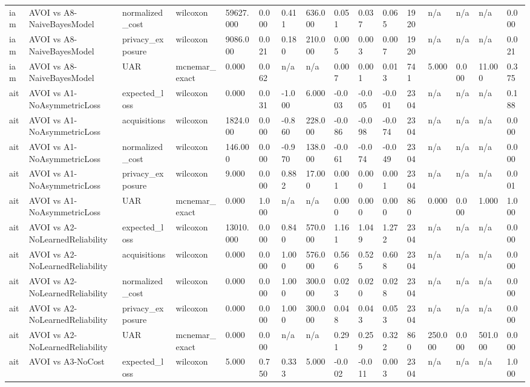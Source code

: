 \begin{table}[!ht]
{\begin{tabular}{llllllllllllllll}
iam & AVOI vs A8-NaiveBayesModel & normalized\_cost & wilcoxon & 59627.000 & 0.000 & 0.411 & 636.000 & 0.051 & 0.037 & 0.065 & 1920 & n/a & n/a & n/a & 0.000 \\
iam & AVOI vs A8-NaiveBayesModel & privacy\_exposure & wilcoxon & 9086.000 & 0.021 & 0.180 & 210.000 & 0.005 & 0.003 & 0.007 & 1920 & n/a & n/a & n/a & 0.021 \\
iam & AVOI vs A8-NaiveBayesModel & UAR & mcnemar\_exact & 0.000 & 0.062 & n/a & n/a & 0.007 & 0.001 & 0.013 & 741 & 5.000 & 0.000 & 11.000 & 0.375 \\
ait & AVOI vs A1-NoAsymmetricLoss & expected\_loss & wilcoxon & 0.000 & 0.031 & -1.000 & 6.000 & -0.003 & -0.005 & -0.001 & 2304 & n/a & n/a & n/a & 0.188 \\
ait & AVOI vs A1-NoAsymmetricLoss & acquisitions & wilcoxon & 1824.000 & 0.000 & -0.860 & 228.000 & -0.086 & -0.098 & -0.074 & 2304 & n/a & n/a & n/a & 0.000 \\
ait & AVOI vs A1-NoAsymmetricLoss & normalized\_cost & wilcoxon & 146.000 & 0.000 & -0.970 & 138.000 & -0.061 & -0.074 & -0.049 & 2304 & n/a & n/a & n/a & 0.000 \\
ait & AVOI vs A1-NoAsymmetricLoss & privacy\_exposure & wilcoxon & 9.000 & 0.000 & 0.882 & 17.000 & 0.001 & 0.000 & 0.001 & 2304 & n/a & n/a & n/a & 0.001 \\
ait & AVOI vs A1-NoAsymmetricLoss & UAR & mcnemar\_exact & 0.000 & 1.000 & n/a & n/a & 0.000 & 0.000 & 0.000 & 860 & 0.000 & 0.000 & 1.000 & 1.000 \\
ait & AVOI vs A2-NoLearnedReliability & expected\_loss & wilcoxon & 13010.000 & 0.000 & 0.840 & 570.000 & 1.161 & 1.049 & 1.272 & 2304 & n/a & n/a & n/a & 0.000 \\
ait & AVOI vs A2-NoLearnedReliability & acquisitions & wilcoxon & 0.000 & 0.000 & 1.000 & 576.000 & 0.566 & 0.525 & 0.608 & 2304 & n/a & n/a & n/a & 0.000 \\
ait & AVOI vs A2-NoLearnedReliability & normalized\_cost & wilcoxon & 0.000 & 0.000 & 1.000 & 300.000 & 0.023 & 0.020 & 0.028 & 2304 & n/a & n/a & n/a & 0.000 \\
ait & AVOI vs A2-NoLearnedReliability & privacy\_exposure & wilcoxon & 0.000 & 0.000 & 1.000 & 300.000 & 0.048 & 0.043 & 0.053 & 2304 & n/a & n/a & n/a & 0.000 \\
ait & AVOI vs A2-NoLearnedReliability & UAR & mcnemar\_exact & 0.000 & 0.000 & n/a & n/a & 0.291 & 0.259 & 0.322 & 860 & 250.000 & 0.000 & 501.000 & 0.000 \\
ait & AVOI vs A3-NoCost & expected\_loss & wilcoxon & 5.000 & 0.750 & 0.333 & 5.000 & -0.002 & -0.011 & 0.003 & 2304 & n/a & n/a & n/a & 1.000 \\

\end{tabular}}
\end{table}
